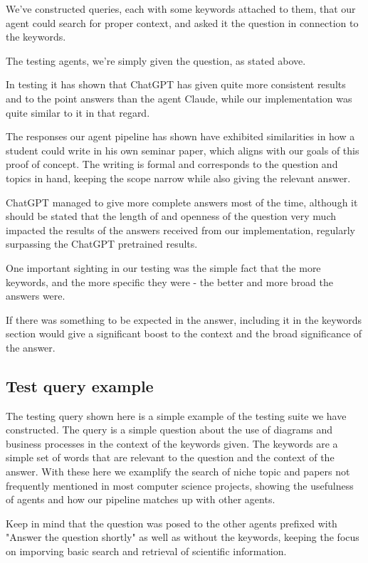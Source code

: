 \documentclass[fleqn,moreauthors,10pt]{ds_report}
\begin{document}
We've constructed queries, each with some keywords attached to them, that our agent could search for proper context, and asked it the question in connection to the keywords.

The testing agents, we're simply given the question, as stated above.

In testing it has shown that ChatGPT has given quite more consistent results and to the point answers than the agent Claude, while our implementation was quite similar to it in that regard.

The responses our agent pipeline has shown have exhibited similarities in how a student could write in his own seminar paper, which aligns with our goals of this proof of concept.
The writing is formal and corresponds to the question and topics in hand, keeping the scope narrow while also giving the relevant answer.

ChatGPT managed to give more complete answers most of the time, although it should be stated that the length of and openness of the question very much impacted the results of the answers received from our implementation, regularly surpassing the ChatGPT pretrained results.

One important sighting in our testing was the simple fact that the more keywords, and the more specific they were - the better and more broad the answers were.

If there was something to be expected in the answer, including it in the keywords section would give a significant boost to the context and the broad significance of the answer.

\subsection*{Test query example}

The testing query shown here is a simple example of the testing suite we have constructed. The query is a simple question about the use of diagrams and business processes in the context of the keywords given. The keywords are a simple set of words that are relevant to the question and the context of the answer.
With these here we examplify the search of niche topic and papers not frequently mentioned in most computer science projects, showing the usefulness of agents and how our pipeline matches up with other agents.

Keep in mind that the question was posed to the other agents prefixed with "Answer the question shortly" as well as without the keywords, keeping the focus on imporving basic search and retrieval of scientific information.
\end{document}

